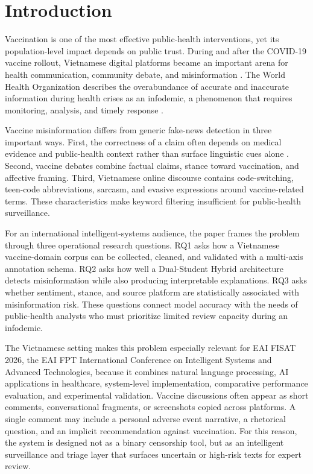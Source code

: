 \documentclass[runningheads]{llncs}
\begin{document}
\section{Introduction}
Vaccination is one of the most effective public-health interventions, yet its population-level impact depends on public trust. During and after the COVID-19 vaccine rollout, Vietnamese digital platforms became an important arena for health communication, community debate, and misinformation \cite{duong2022hesitancy,ha2022media,bui2025vaccine}. The World Health Organization describes the overabundance of accurate and inaccurate information during health crises as an infodemic, a phenomenon that requires monitoring, analysis, and timely response \cite{who2020infodemic,eysenbach2002infodemiology}.

Vaccine misinformation differs from generic fake-news detection in three important ways. First, the correctness of a claim often depends on medical evidence and public-health context rather than surface linguistic cues alone \cite{vraga2020misinformation}. Second, vaccine debates combine factual claims, stance toward vaccination, and affective framing. Third, Vietnamese online discourse contains code-switching, teen-code abbreviations, sarcasm, and evasive expressions around vaccine-related terms. These characteristics make keyword filtering insufficient for public-health surveillance.

For an international intelligent-systems audience, the paper frames the problem through three operational research questions. RQ1 asks how a Vietnamese vaccine-domain corpus can be collected, cleaned, and validated with a multi-axis annotation schema. RQ2 asks how well a Dual-Student Hybrid architecture detects misinformation while also producing interpretable explanations. RQ3 asks whether sentiment, stance, and source platform are statistically associated with misinformation risk. These questions connect model accuracy with the needs of public-health analysts who must prioritize limited review capacity during an infodemic.

The Vietnamese setting makes this problem especially relevant for EAI FISAT 2026, the EAI FPT International Conference on Intelligent Systems and Advanced Technologies, because it combines natural language processing, AI applications in healthcare, system-level implementation, comparative performance evaluation, and experimental validation. Vaccine discussions often appear as short comments, conversational fragments, or screenshots copied across platforms. A single comment may include a personal adverse event narrative, a rhetorical question, and an implicit recommendation against vaccination. For this reason, the system is designed not as a binary censorship tool, but as an intelligent surveillance and triage layer that surfaces uncertain or high-risk texts for expert review.
\end{document}
